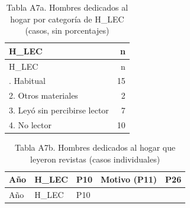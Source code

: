 \documentclass[
  spanish,
  12pt,
]{extarticle}
\begin{document}
\begin{longtable}[]{@{}lr@{}}
\caption{Tabla A7a. Hombres dedicados al hogar por categoría de H\_LEC
(casos, sin porcentajes)}\tabularnewline
\toprule\noalign{}
H\_LEC & n \\
\midrule\noalign{}
\endfirsthead
\toprule\noalign{}
H\_LEC & n \\
\midrule\noalign{}
\endhead
\bottomrule\noalign{}
\endlastfoot
1. Habitual & 15 \\
2. Otros materiales & 2 \\
3. Leyó sin percibirse lector & 7 \\
4. No lector & 10 \\
\end{longtable}

\begin{longtable}[]{@{}
  >{\raggedleft\arraybackslash}p{}
  >{\raggedright\arraybackslash}p{}
  >{\raggedleft\arraybackslash}p{}
  >{\raggedright\arraybackslash}p{}
  >{\raggedleft\arraybackslash}p{}@{}}
\caption{Tabla A7b. Hombres dedicados al hogar que leyeron revistas
(casos individuales)}\tabularnewline
\toprule\noalign{}
\begin{minipage}[b]{\linewidth}\raggedleft
Año
\end{minipage} & \begin{minipage}[b]{\linewidth}\raggedright
H\_LEC
\end{minipage} & \begin{minipage}[b]{\linewidth}\raggedleft
P10
\end{minipage} & \begin{minipage}[b]{\linewidth}\raggedright
Motivo (P11)
\end{minipage} & \begin{minipage}[b]{\linewidth}\raggedleft
P26
\end{minipage} \\
\midrule\noalign{}
\endfirsthead
\toprule\noalign{}
\begin{minipage}[b]{\linewidth}\raggedleft
Año
\end{minipage} & \begin{minipage}[b]{\linewidth}\raggedright
H\_LEC
\end{minipage} & \begin{minipage}[b]{\linewidth}\raggedleft
P10
\end{minipage} & \begin{minipage}[b]{\linewidth}\raggedright

\end{minipage}
\end{longtable}
\end{document}

